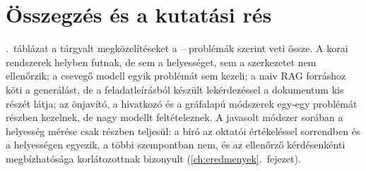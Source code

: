 \section{Összegzés és a kutatási rés}
\label{sec:irod-res}

\Az{\ref{tab:irodalom-osszevetes}}.~táblázat a tárgyalt megközelítéseket a -- problémák szerint veti
össze. A korai rendszerek helyben futnak, de sem a helyességet, sem a szerkezetet nem ellenőrzik; a
csevegő modell egyik problémát sem kezeli; a naiv RAG forráshoz köti a generálást, de a feladatleírásból
készült lekérdezéssel a dokumentum kis részét látja; az önjavító, a hivatkozó és a gráfalapú módszerek
egy-egy problémát részben kezelnek, de nagy modellt feltételeznek. A javasolt módszer sorában a helyesség
mérése csak részben teljesül: a bíró az oktatói értékeléssel sorrendben és a helyességen egyezik, a többi
szempontban nem, és az ellenőrző kérdésenkénti
megbízhatósága korlátozottnak bizonyult (\ref{ch:eredmenyek}.~fejezet).

